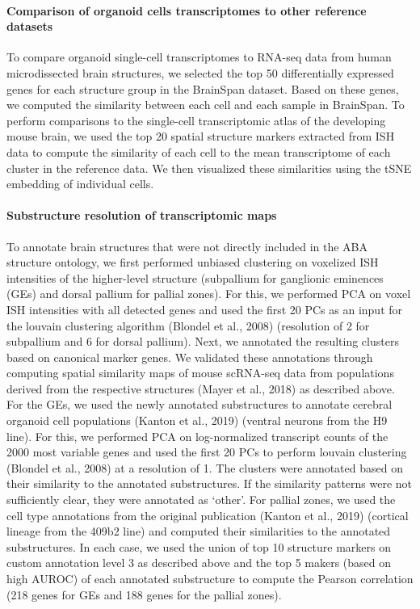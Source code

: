 \paragraph{Comparison of organoid cells transcriptomes to other reference datasets}
To compare organoid single-cell transcriptomes to RNA-seq data from human microdissected brain structures, we selected the top 50 differentially expressed genes for each structure group in the BrainSpan dataset. Based on these genes, we computed the similarity between each cell and each sample in BrainSpan. To perform comparisons to the single-cell transcriptomic atlas of the developing mouse brain, we used the top 20 spatial structure markers extracted from ISH data to compute the similarity of each cell to the mean transcriptome of each cluster in the reference data. We then visualized these similarities using the tSNE embedding of individual cells. 

\paragraph{Substructure resolution of transcriptomic maps}
To annotate brain structures that were not directly included in the ABA structure ontology, we first performed unbiased clustering on voxelized ISH intensities of the higher-level structure (subpallium for ganglionic eminences (GEs) and dorsal pallium for pallial zones). For this, we performed PCA on voxel ISH intensities with all detected genes and used the first 20 PCs as an input for the louvain clustering algorithm (Blondel et al., 2008) (resolution of 2 for subpallium and 6 for dorsal pallium). Next, we annotated the resulting clusters based on canonical marker genes. We validated these annotations through computing spatial similarity maps of mouse scRNA-seq data from populations derived from the respective structures (Mayer et al., 2018) as described above. For the GEs, we used the newly annotated substructures to annotate cerebral organoid cell populations (Kanton et al., 2019) (ventral neurons from the H9 line). For this, we performed PCA on log-normalized transcript counts of the 2000 most variable genes and used the first 20 PCs to perform louvain clustering (Blondel et al., 2008) at a resolution of 1. The clusters were annotated based on their similarity to the annotated substructures. If the similarity patterns were not sufficiently clear, they were annotated as ‘other’. For pallial zones, we used the cell type annotations from the original publication (Kanton et al., 2019) (cortical lineage from the 409b2 line) and computed their similarities to the annotated substructures. In each case, we used the union of top 10 structure markers on custom annotation level 3 as described above and the top 5 makers (based on high AUROC) of each annotated substructure to compute the Pearson correlation (218 genes for GEs and 188 genes for the pallial zones).

